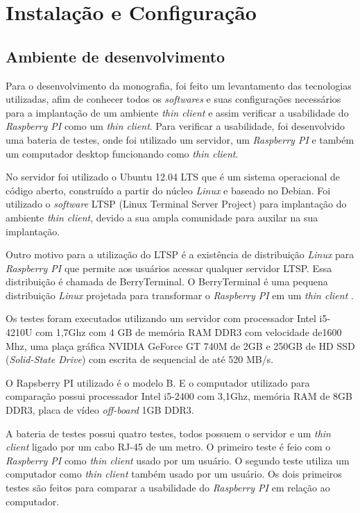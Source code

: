 \documentclass[
	12pt,				%
	openright,			%
	twoside,			%
	a4paper,			%
	chapter=TITLE,		%
	english,			%
	brazil				%
	]{abntex2}
\begin{document}
\part{Instalação e Configuração}

\chapter{Ambiente de desenvolvimento}
\label{AmbienteTest}
Para o desenvolvimento da monografia, foi feito um levantamento das tecnologias utilizadas, afim de conhecer todos os \textit{softwares} e suas configurações necessários para a implantação de um ambiente \textit{thin client} e assim verificar a usabilidade do \textit{Raspberry PI} como um \textit{thin client}. Para verificar a usabilidade, foi desenvolvido uma bateria de testes, onde foi utilizado um servidor, um \textit{Raspberry PI} e também um computador desktop funcionando como \textit{thin client}. 

No servidor foi utilizado o Ubuntu 12.04 LTS que é um sistema operacional de código aberto, construído a partir do núcleo \textit{Linux} e baseado no Debian\cite{ubuntu}. Foi utilizado o \textit{software} LTSP (Linux Terminal Server Project) para implantação do ambiente \textit{thin client}, devido a sua ampla comunidade para auxilar na sua implantação. 

Outro motivo para a utilização do LTSP é a existência de distribuição \textit{Linux} para \textit{Raspberry PI} que permite aos usuários acessar qualquer servidor LTSP. Essa distribuição é chamada de BerryTerminal. O BerryTerminal é uma pequena distribuição \textit{Linux} projetada para transformar o \textit{Raspberry PI} em um \textit{thin client} \cite{berryterminal}.

Os testes foram executados utilizando um servidor com processador Intel i5-4210U com 1,7Ghz com 4 GB de memória RAM DDR3 com velocidade de1600 Mhz, uma plaça gráfica NVIDIA GeForce GT 740M de 2GB e 250GB de HD SSD (\textit{Solid-State Drive}) com escrita de sequencial de até 520 MB/s.
	
O Rapsberry PI utilizado é o modelo B. E o computador utilizado para comparação possui processador Intel i5-2400 com 3,1Ghz, memória RAM de 8GB DDR3, placa de vídeo \textit{off-board} 1GB DDR3.

A bateria de testes possui quatro testes, todos possuem o servidor e um \textit{thin client} ligado por um cabo RJ-45 de um metro. O primeiro teste é feio com o \textit{Raspberry PI} como \textit{thin client} usado por um usuário.  O segundo teste utiliza um computador como \textit{thin client} também usado por um usuário. Os dois primeiros testes são feitos para comparar a usabilidade do \textit{Raspberry PI}  em relação ao computador. 
\end{document}
